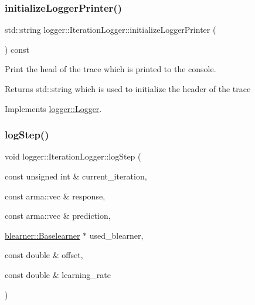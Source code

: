 \subsubsection{\texorpdfstring{initialize\+Logger\+Printer()}{initializeLoggerPrinter()}}
{\footnotesize\ttfamily std\+::string logger\+::\+Iteration\+Logger\+::initialize\+Logger\+Printer (\begin{DoxyParamCaption}{ }\end{DoxyParamCaption}) const\hspace{0.3cm}{\ttfamily [virtual]}}



Print the head of the trace which is printed to the console. 

\begin{DoxyReturn}{Returns}
{\ttfamily std\+::string} which is used to initialize the header of the trace 
\end{DoxyReturn}


Implements \mbox{\hyperlink{classlogger_1_1_logger_a825f96e8564ac4013ff09ef842c0aeec}{logger\+::\+Logger}}.

\mbox{\label{classlogger_1_1_iteration_logger_a36437ff3a6e6a617f6d2107eab9fba7a}} 
\subsubsection{\texorpdfstring{log\+Step()}{logStep()}}
{\footnotesize\ttfamily void logger\+::\+Iteration\+Logger\+::log\+Step (\begin{DoxyParamCaption}\item[{const unsigned int \&}]{current\+\_\+iteration,  }\item[{const arma\+::vec \&}]{response,  }\item[{const arma\+::vec \&}]{prediction,  }\item[{\mbox{\hyperlink{classblearner_1_1_baselearner}{blearner\+::\+Baselearner}} $\ast$}]{used\+\_\+blearner,  }\item[{const double \&}]{offset,  }\item[{const double \&}]{learning\+\_\+rate }\end{DoxyParamCaption})\hspace{0.3cm}{\ttfamily [virtual]}}



